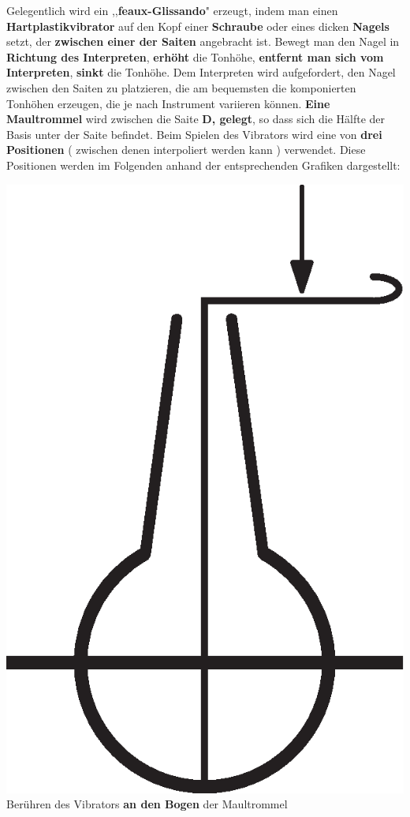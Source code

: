 \documentclass[12pt]{article}
\newcommand*\circled[1]{\tikz[baseline=(char.base)]{
            \node[shape=circle,draw,inner sep=1pt] (char) {#1};}}
\begin{document}
\textbf{\circled{2}} Gelegentlich wird ein ,,\textbf{feaux-Glissando}" erzeugt, indem man einen \textbf{Hartplastikvibrator} auf den Kopf einer \textbf{Schraube} oder eines dicken \textbf{Nagels} setzt, der \textbf{zwischen einer der Saiten} angebracht ist. Bewegt man den Nagel in \textbf{Richtung des Interpreten}, \textbf{erhöht} die Tonhöhe, \textbf{entfernt man sich vom Interpreten}, \textbf{sinkt} die Tonhöhe. Dem Interpreten wird aufgefordert, den Nagel zwischen den Saiten zu platzieren, die am bequemsten die komponierten Tonhöhen erzeugen, die je nach Instrument variieren können. \textbf{\circled{3} Eine Maultrommel} wird zwischen die Saite \textbf{D, gelegt}, so dass sich die Hälfte der Basis unter der Saite befindet. Beim Spielen des Vibrators wird eine von \textbf{drei Positionen} ( zwischen denen interpoliert werden kann ) verwendet. Diese Positionen werden im Folgenden anhand der entsprechenden Grafiken dargestellt:

\includegraphics[scale=0.2]{crook.eps}
\circled{1} Berühren des Vibrators \textbf{an den Bogen} der Maultrommel \\
\end{document}
